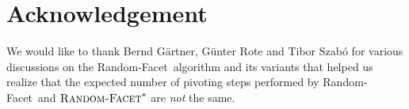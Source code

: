 \documentclass[twoside,11pt]{article}
\newcommand{\RandomFacet}{\mbox{\sc Random-}\allowbreak\mbox{\sc Facet}}
\begin{document}
\section*{Acknowledgement}

We would like to thank Bernd G{\"a}rtner, G\"{u}nter Rote and Tibor Szab\'{o} for various discussions on the \RandomFacet\ algorithm and its variants that helped us realize that the expected number of pivoting steps performed by \RandomFacet\ and $\RandomFacet^*$ are \emph{not} the same.



\end{document}
